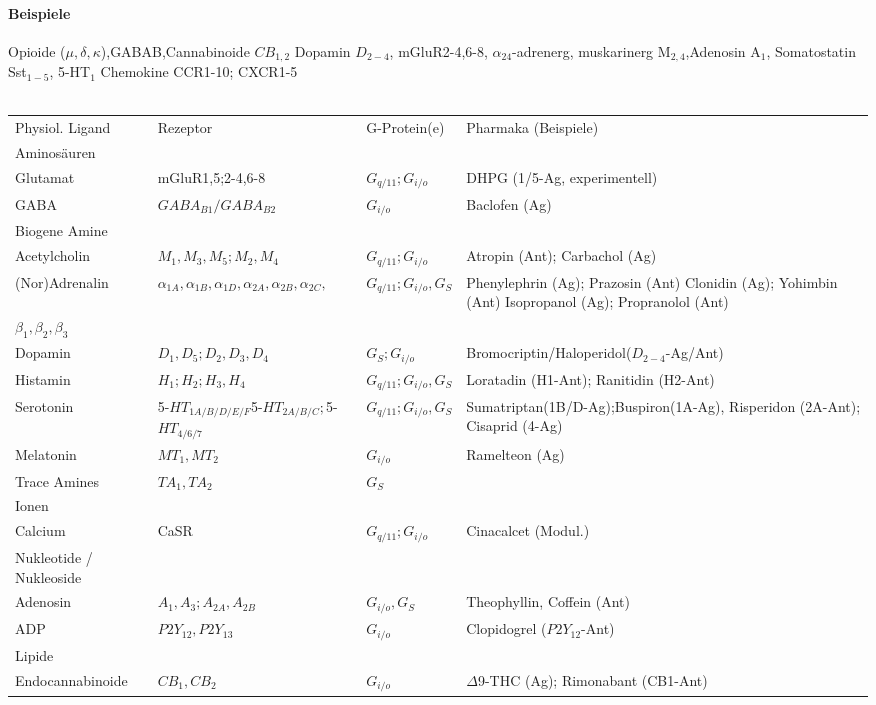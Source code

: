\documentclass[10pt,a4paper]{report}
\begin{document}
\paragraph{Beispiele}Opioide ($\mu,\delta,\kappa$),GABAB,Cannabinoide $CB_{1,2}$	Dopamin $D_{2-4}$, mGluR2-4,6-8, $\alpha_24$-adrenerg, muskarinerg M$_{2,4}$,Adenosin A$_1$, Somatostatin Sst$_{1-5}$, 5-HT$_1$
Chemokine CCR1-10; CXCR1-5 \\ \\
\scriptsize
\begin{tabularx}{\textwidth}{XXXX}
Physiol. Ligand&Rezeptor&G-Protein(e)&Pharmaka (Beispiele)\\
Aminosäuren&&&\\
Glutamat&mGluR1,5;2-4,6-8&$G_{q/11}; G_{i/o}$&DHPG (1/5-Ag, experimentell)\\
GABA&$GABA_{B1} / GABA_{B2}$&$G_{i/o}$&Baclofen (Ag)\\
Biogene Amine&&&\\
Acetylcholin&$M_1, M_3, M_5; M_2, M_4$&$G_{q/11}; G_{i/o}$&Atropin (Ant); Carbachol (Ag)\\
(Nor)Adrenalin& $\alpha_{1A}, \alpha_{1B}, \alpha_{1D}, \alpha_{2A}, \alpha_{2B}, \alpha_{2C}, $&$G_{q/11}; G_{i/o}, G_S$&Phenylephrin (Ag); Prazosin (Ant)  Clonidin (Ag); Yohimbin (Ant) Isopropanol (Ag); Propranolol (Ant)\\
$\beta_1, \beta_2, \beta_3$&&\\
Dopamin&$D_1,D_5; D_2,D_3,D_4$& $G_{S}; G_{i/o}$&Bromocriptin/Haloperidol($D_{2-4}$-Ag/Ant)\\
Histamin&$H_1; H_2; H_3,H_4$&$G_{q/11}; G_{i/o}, G_S$&Loratadin (H1-Ant); Ranitidin (H2-Ant)\\
Serotonin&5-$HT_{1A/B/D/E/F}$5-$HT_{2A/B/C}; $5-$HT_{4/6/7}$&$G_{q/11}; G_{i/o}, G_S$& Sumatriptan(1B/D-Ag);Buspiron(1A-Ag), Risperidon (2A-Ant); Cisaprid (4-Ag)\\
Melatonin&$MT_1,MT_2$&$G_{i/o}$&Ramelteon (Ag)\\
Trace Amines&$TA_1, TA_2$&$G_S$&\\
Ionen&&&\\
Calcium&CaSR&$G_{q/11}; G_{i/o}$&Cinacalcet (Modul.)\\
Nukleotide / Nukleoside&&&\\
Adenosin&$A_1,A_3; A_{2A}, A_{2B}$&$G_{i/o}, G_S$&Theophyllin, Coffein (Ant)\\
ADP&$P2Y_{12}, P2Y_{13}$&$G_{i/o}$&Clopidogrel ($P2Y_{12}$-Ant)\\
Lipide&&&\\
Endocannabinoide&$CB_1, CB_2$&$G_{i/o}$&$\Delta$9-THC (Ag); Rimonabant (CB1-Ant)\\

\end{tabularx}
\end{document}
